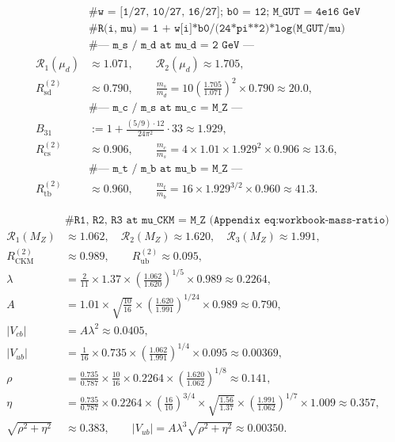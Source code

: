 \documentclass[aps,prd,onecolumn,amsmath,amssymb,nofootinbib,11pt]{revtex4-2}
\numberwithin{equation}{section}
\theoremstyle{plain}
\theoremstyle{definition}
\theoremstyle{remark}
\begin{document}
\begin{equation}\label{eq:workbook-quark-masses}
\begin{aligned}
  &\texttt{\# w = [1/27, 10/27, 16/27]; b0 = 12; M\_GUT = 4e16 GeV}\\
  &\texttt{\# R(i, mu) = 1 + w[i]*b0/(24*pi**2)*log(M\_GUT/mu)}\\
  &\texttt{\# --- m\_s / m\_d at mu\_d = 2 GeV ---}\\
  \mathcal{R}_1(\mu_d) &\approx 1.071,\qquad
  \mathcal{R}_2(\mu_d) \approx 1.705,\\
  R_{\mathrm{sd}}^{(2)} &\approx 0.790,
  \qquad
  \frac{m_s}{m_d}
  = 10\left(\frac{1.705}{1.071}\right)^{\!2}\times 0.790
  \approx 20.0,\\
  &\texttt{\# --- m\_c / m\_s at mu\_c = M\_Z ---}\\
  B_{31} &:= 1+\frac{(5/9)\cdot 12}{24\pi^2}\cdot 33 \approx 1.929,\\
  R_{\mathrm{cs}}^{(2)} &\approx 0.906,
  \qquad
  \frac{m_c}{m_s}
  = 4\times 1.01\times 1.929^{2}\times 0.906
  \approx 13.6,\\
  &\texttt{\# --- m\_t / m\_b at mu\_b = M\_Z ---}\\
  R_{\mathrm{tb}}^{(2)} &\approx 0.960,
  \qquad
  \frac{m_t}{m_b}
  = 16\times 1.929^{3/2}\times 0.960
  \approx 41.3.
\end{aligned}
\end{equation}

\begin{equation}\label{eq:workbook-ckm}
\begin{aligned}
  &\texttt{\# R1, R2, R3 at mu\_CKM = M\_Z (Appendix eq:workbook-mass-ratio)}\\
  \mathcal{R}_1(M_Z) &\approx 1.062,\quad
  \mathcal{R}_2(M_Z) \approx 1.620,\quad
  \mathcal{R}_3(M_Z) \approx 1.991,\\
  R_{\mathrm{CKM}}^{(2)} &\approx 0.989,\qquad
  R_{\mathrm{ub}}^{(2)} \approx 0.095,\\
  \lambda
  &= \frac{2}{11}\times 1.37\times
     \left(\frac{1.062}{1.620}\right)^{\!1/5}\times 0.989
  \approx 0.2264,\\
  A
  &= 1.01\times\sqrt{\frac{10}{16}}\times
     \left(\frac{1.620}{1.991}\right)^{\!1/24}\times 0.989
  \approx 0.790,\\
  |V_{cb}| &= A\lambda^2 \approx 0.0405,\\
  |V_{ub}|
  &= \frac{1}{16}\times 0.735\times
     \left(\frac{1.062}{1.991}\right)^{\!1/4}\times 0.095
  \approx 0.00369,\\
  \rho
  &= \frac{0.735}{0.787}\times\frac{10}{16}\times 0.2264\times
     \left(\frac{1.620}{1.062}\right)^{\!1/8}
  \approx 0.141,\\
  \eta
  &= \frac{0.735}{0.787}\times 0.2264\times
     \left(\frac{16}{10}\right)^{\!3/4}\times
     \sqrt{\frac{1.56}{1.37}}\times
     \left(\frac{1.991}{1.062}\right)^{\!1/7}\times 1.009
  \approx 0.357,\\
  \sqrt{\rho^2+\eta^2} &\approx 0.383,\qquad
  |V_{ub}| = A\lambda^3\sqrt{\rho^2+\eta^2} \approx 0.00350.
\end{aligned}
\end{equation}
\end{document}

